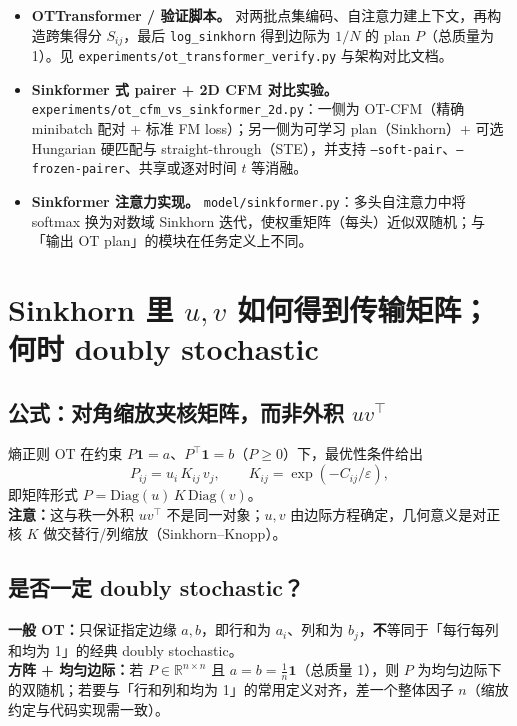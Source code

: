 \documentclass[UTF8]{ctexart}
\begin{document}
\begin{itemize}
  \item \textbf{OTTransformer / 验证脚本。}
    对两批点集编码、自注意力建上下文，再构造跨集得分 $S_{ij}$，最后 \texttt{log\_sinkhorn} 得到边际为 $1/N$ 的 plan $P$（总质量为 1）。见 \texttt{experiments/ot\_transformer\_verify.py} 与架构对比文档。
  \item \textbf{Sinkformer 式 pairer + 2D CFM 对比实验。}
    \texttt{experiments/ot\_cfm\_vs\_sinkformer\_2d.py}：一侧为 OT-CFM（精确 minibatch 配对 + 标准 FM loss）；另一侧为可学习 plan（Sinkhorn）+ 可选 Hungarian 硬匹配与 straight-through（STE），并支持 \texttt{--soft-pair}、\texttt{--frozen-pairer}、共享或逐对时间 $t$ 等消融。
  \item \textbf{Sinkformer 注意力实现。}
    \texttt{model/sinkformer.py}：多头自注意力中将 softmax 换为对数域 Sinkhorn 迭代，使权重矩阵（每头）近似双随机；与「输出 OT plan」的模块在任务定义上不同。
\end{itemize}

\section{Sinkhorn 里 $u,v$ 如何得到传输矩阵；何时 doubly stochastic}

\subsection{公式：对角缩放夹核矩阵，而非外积 $uv^\top$}

熵正则 OT 在约束 $P\mathbf{1}=a$、$P^\top\mathbf{1}=b$（$P\ge 0$）下，最优性条件给出
\[
P_{ij}=u_i\,K_{ij}\,v_j,\qquad K_{ij}=\exp(-C_{ij}/\varepsilon),
\]
即矩阵形式 \textbf{$P=\mathrm{Diag}(u)\,K\,\mathrm{Diag}(v)$}。\\
\textbf{注意：}这与秩一外积 $uv^\top$ 不是同一对象；$u,v$ 由边际方程确定，几何意义是对正核 $K$ 做交替行/列缩放（Sinkhorn--Knopp）。

\subsection{是否一定 doubly stochastic？}

\textbf{一般 OT：}只保证指定边缘 $a,b$，即行和为 $a_i$、列和为 $b_j$，\textbf{不}等同于「每行每列和均为 1」的经典 doubly stochastic。\\
\textbf{方阵 + 均匀边际：}若 $P\in\mathbb{R}^{n\times n}$ 且 $a=b=\frac1n\mathbf{1}$（总质量 1），则 $P$ 为均匀边际下的双随机；若要与「行和列和均为 1」的常用定义对齐，差一个整体因子 $n$（缩放约定与代码实现需一致）。
\end{document}
